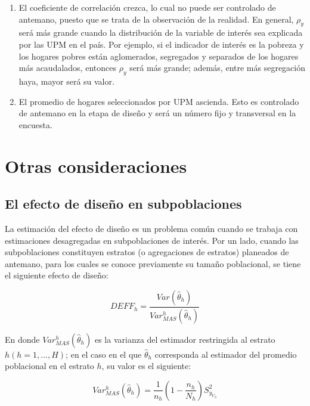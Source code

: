 \documentclass[
  12pt,
  spanish,
]{book}
\providecommand{\tightlist}{%
  \setlength{\itemsep}{0pt}\setlength{\parskip}{0pt}}
\begin{document}
\begin{enumerate}
\def\labelenumi{\arabic{enumi}.}
\tightlist
\item
  El coeficiente de correlación crezca, lo cual no puede ser controlado de antemano, puesto que se trata de la observación de la realidad. En general, \(\rho_y\) será más grande cuando la distribución de la variable de interés sea explicada por las UPM en el país. Por ejemplo, si el indicador de interés es la pobreza y los hogares pobres están aglomerados, segregados y separados de los hogares más acaudalados, entonces \(\rho_y\) será más grande; además, entre más segregación haya, mayor será su valor.
\item
  El promedio de hogares seleccionados por UPM ascienda. Esto es controlado de antemano en la etapa de diseño y será un número fijo y transversal en la encuesta.
\end{enumerate}

\hypertarget{otras-consideraciones}{%
\section{Otras consideraciones}\label{otras-consideraciones}}

\hypertarget{el-efecto-de-diseuxf1o-en-subpoblaciones}{%
\subsection*{El efecto de diseño en subpoblaciones}\label{el-efecto-de-diseuxf1o-en-subpoblaciones}}

La estimación del efecto de diseño es un problema común cuando se trabaja con estimaciones desagregadas en subpoblaciones de interés. Por un lado, cuando las subpoblaciones constituyen estratos (o agregaciones de estratos) planeados de antemano, para los cuales se conoce previamente su tamaño poblacional, se tiene el siguiente efecto de diseño:

\[
DEFF_h= \frac{Var (\hat\theta_h) }{Var_{MAS}^h(\hat\theta_h) }
\]

En donde \(Var_{MAS}^h(\hat\theta_h)\) es la varianza del estimador restringida al estrato \(h (h=1,\ldots, H)\); en el caso en el que \(\hat\theta_h\) corresponda al estimador del promedio poblacional en el estrato \(h\), su valor es el siguiente:

\[
Var_{MAS}^h(\hat\theta_h)=\frac{1}{n_h}\left(1-\frac{n_h}{N_h}\right)S^2_{y_{U_h}}
\]
\end{document}
